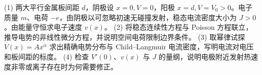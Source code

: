 (1) 两大平行金属板间距 \(d\)，阴极设 \(x=0,V=0\)，阳极 \(x=d,V=V_0>0\)。电子质量 \(m\)、电荷 \(-e\)，由阴极以可忽略初速无碰撞发射，稳态电流密度大小为 \(J>0\)。由能量守恒求电子速度 \(v(x)\)。
(2) 将稳态连续性方程与 Poisson 方程联立，推导电势的非线性微分方程，并说明空间电荷限制边界条件。
(3) 取幂律试探 \(V(x)=A x^\alpha\) 求出精确电势分布与 Child–Langmuir 电流密度，写明电流对电压和板间距的标度。
(4) 检查 \(V'(0)\)、\(v(x)\) 与 \(J\) 的量纲，说明电极附近发射热速度非零或离子存在时为何需要修正。
